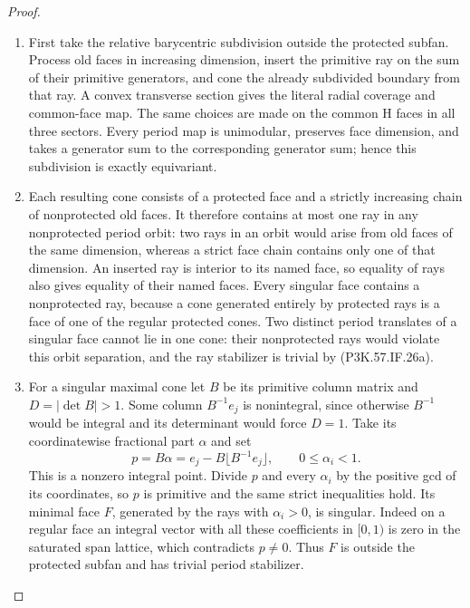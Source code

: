 \begin{proof}
\begin{enumerate}[label=\arabic*.]
\item First take the relative barycentric subdivision outside
the protected subfan. Process old faces in increasing
dimension, insert the primitive ray on the sum of their
primitive generators, and cone the already subdivided
boundary from that ray. A convex transverse section gives
the literal radial coverage and common-face map. The
same choices are made on the common H faces in all three
sectors. Every period map is unimodular, preserves face
dimension, and takes a generator sum to the corresponding
generator sum; hence this subdivision is exactly equivariant.

\item Each resulting cone consists of a protected face and a
strictly increasing chain of nonprotected old faces. It
therefore contains at most one ray in any nonprotected
period orbit: two rays in an orbit would arise from old
faces of the same dimension, whereas a strict face chain
contains only one of that dimension. An inserted ray is
interior to its named face, so equality of rays also gives
equality of their named faces. Every singular face contains
a nonprotected ray, because a cone generated entirely by
protected rays is a face of one of the regular protected
cones. Two distinct period translates of a singular face
cannot lie in one cone: their nonprotected rays would
violate this orbit separation, and the ray stabilizer is
trivial by (P3K.57.IF.26a).

\item For a singular maximal cone let \(B\) be its primitive
column matrix and \(D=|\det B|>1\). Some column
\(B^{-1}e_j\) is nonintegral, since otherwise \(B^{-1}\)
would be integral and its determinant would force \(D=1\).
Take its coordinatewise fractional part \(\alpha\) and set
\[
 p=B\alpha=e_j-B\lfloor B^{-1}e_j\rfloor,
 \qquad 0\le\alpha_i<1.                              \tag{P3K.57.IF.26b}
\]
This is a nonzero integral point. Divide \(p\) and every
\(\alpha_i\) by the positive gcd of its coordinates, so
\(p\) is primitive and the same strict inequalities hold.
Its minimal face \(F\), generated by the rays with
\(\alpha_i>0\), is singular. Indeed on a regular face
an integral vector with all these coefficients in
\([0,1)\) is zero in the saturated span lattice, which
contradicts \(p\ne0\). Thus \(F\) is outside the
protected subfan and has trivial period stabilizer.


\end{enumerate}
\end{proof}
